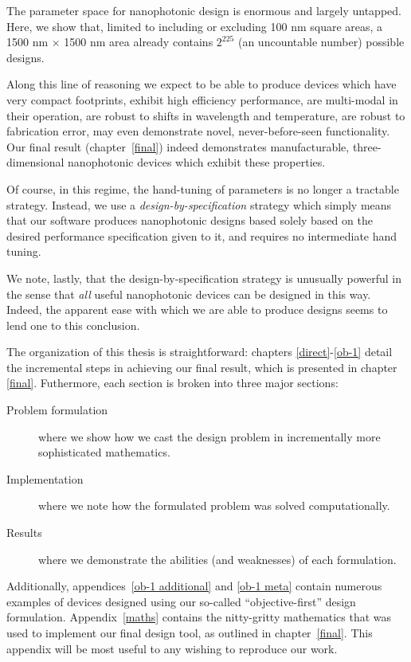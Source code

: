     {The parameter space for nanophotonic design is enormous and largely untapped.
    Here, we show that, 
        limited to including or excluding 100 nm square areas,
        a 1500 nm $\times$ 1500 nm area already contains $2^{225}$ 
        (an uncountable number) possible designs.}

Along this line of reasoning
    we expect to be able to produce devices which
    \BI have very compact footprints,
    \I  exhibit high efficiency performance,
    \I  are multi-modal in their operation,
    \I  are robust to shifts in wavelength and temperature,
    \I  are robust to fabrication error,
    \I  may even demonstrate novel, never-before-seen functionality. \EI
Our final result (chapter~\ref{final}) indeed demonstrates
    manufacturable, three-dimensional nanophotonic devices which
    exhibit these properties.

Of course, in this regime, the hand-tuning of parameters 
    is no longer a tractable strategy.
Instead, we use a \emph{design-by-specification} strategy
    which simply means that our software produces nanophotonic designs
    based solely based on the desired performance specification given to it,
    and requires no intermediate hand tuning.

We note, lastly, that the design-by-specification strategy
    is unusually powerful in the sense that \emph{all} useful nanophotonic devices
    can be designed in this way.
Indeed, the apparent ease with which we are able to produce designs seems
    to lend one to this conclusion.

The organization of this thesis is straightforward: 
    chapters \ref{direct}-\ref{ob-1} detail the incremental steps in achieving
    our final result, which is presented in chapter \ref{final}.
Futhermore, each section is broken into three major sections:
    \begin{description}
    \item[Problem formulation] where we show how we cast the design problem
        in incrementally more sophisticated mathematics.
    \item[Implementation] where we note how the formulated problem 
        was solved computationally.
    \item[Results] where we demonstrate the abilities (and weaknesses)
        of each formulation.
    \end{description}

Additionally, appendices~\ref{ob-1 additional} and \ref{ob-1 meta} 
    contain numerous examples of devices designed using our
    so-called ``objective-first'' design formulation.
Appendix~\ref{maths} contains the nitty-gritty mathematics
    that was used to implement our final design tool, 
    as outlined in chapter~\ref{final}.
This appendix will be most useful to any wishing to reproduce our work.
